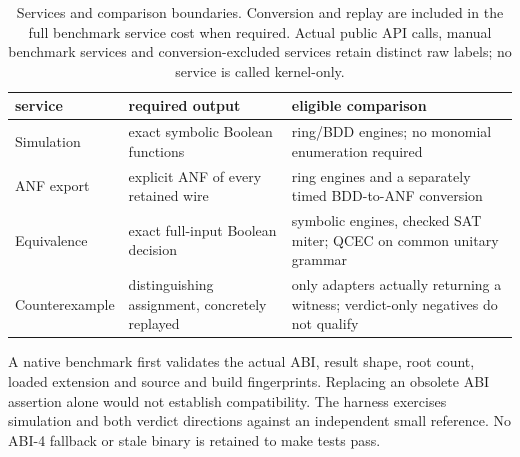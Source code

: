 \documentclass[10pt,a4paper]{article}
\begin{document}
\begin{table}[tbp]
\centering\small
\caption{Services and comparison boundaries. Conversion and replay are included in the full benchmark
service cost when required. Actual public API calls, manual benchmark services and
conversion-excluded services retain distinct raw labels; no service is called kernel-only.}
\label{tab:services}
\begin{tabular}{p{2.5cm}p{5.4cm}p{7.0cm}}
\toprule
service & required output & eligible comparison \\
\midrule
Simulation & exact symbolic Boolean functions & ring/BDD engines; no monomial enumeration required \\
ANF export & explicit ANF of every retained wire & ring engines and a separately timed BDD-to-ANF conversion \\
Equivalence & exact full-input Boolean decision & symbolic engines, checked SAT miter; QCEC on common unitary grammar \\
Counterexample & distinguishing assignment, concretely replayed & only adapters actually returning a witness; verdict-only negatives do not qualify \\
\bottomrule
\end{tabular}
\end{table}

A native benchmark first validates the actual ABI, result shape, root count, loaded extension
and source and build fingerprints. Replacing an obsolete ABI assertion alone would not establish
compatibility. The harness exercises simulation and both verdict directions against an
independent small reference. No ABI-4 fallback or stale binary is retained to make tests pass.
\end{document}
